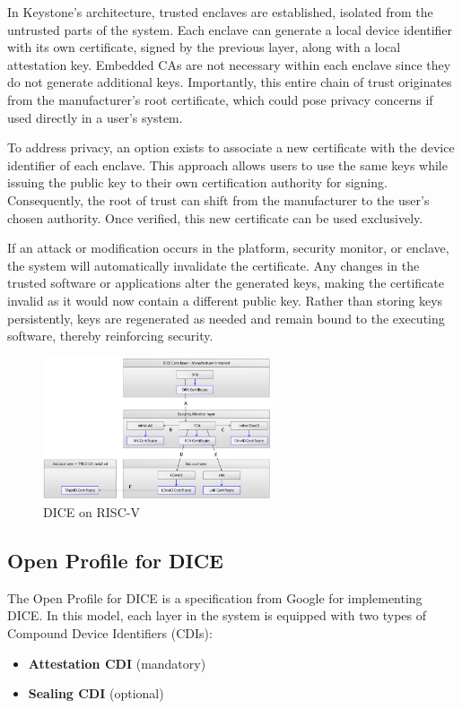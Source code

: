 In Keystone’s architecture, trusted enclaves are established, isolated
from the untrusted parts of the system. Each enclave can generate a
local device identifier with its own certificate, signed by the
previous layer, along with a local attestation key. Embedded CAs are
not necessary within each enclave since they do not generate additional
keys. Importantly, this entire chain of trust originates from the
manufacturer’s root certificate, which could pose privacy concerns if
used directly in a user's system.

To address privacy, an option exists to associate a new certificate
with the device identifier of each enclave. This approach allows users
to use the same keys while issuing the public key to their own
certification authority for signing. Consequently, the root of trust
can shift from the manufacturer to the user’s chosen authority. Once
verified, this new certificate can be used exclusively.

If an attack or modification occurs in the platform, security monitor,
or enclave, the system will automatically invalidate the certificate.
Any changes in the trusted software or applications alter the generated
keys, making the certificate invalid as it would now contain a
different public key. Rather than storing keys persistently, keys are
regenerated as needed and remain bound to the executing software,
thereby reinforcing security.

\begin{figure}[H]
  \centering
  \includegraphics[width=0.6\textwidth]{img/dice riscv.png}
  \caption{DICE on RISC-V}
\end{figure}

\subsection{Open Profile for DICE}

The Open Profile for DICE is a specification from Google for
implementing DICE. In this model, each layer in the system is
equipped with two types of Compound Device Identifiers (CDIs):
\begin{itemize}
    \item \textbf{Attestation CDI} (mandatory)
    \item \textbf{Sealing CDI} (optional)
\end{itemize}


